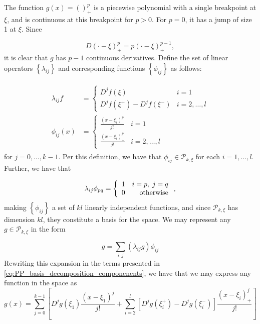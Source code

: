 \documentclass[12pt]{article}
\newcommand{\PP}{\mathcal{P}}
\theoremstyle{definition}
\begin{document}
The function $g\left(x\right) = \left(\right)_+^p$ is a piecewise polynomial with a single breakpoint at $\xi$, and is continuous at this breakpoint for $p>0$. For $p=0$, it has a jump of size 1 at $\xi$. Since

\[
D\left( \cdot - \xi\right)_+^p = p \left( \cdot - \xi\right)_+^{p-1},
\]
\noindent
it is clear that $g$ has $p-1$ continuous derivatives. Define the set of linear operators $\left\{ \lambda_{ij} \right\}$ and corresponding functions $\left\{ \phi_{ij} \right\}$ as follows:

\begin{align}
\begin{split}
\lambda_{ij}f  &= \left\{\begin{array}{lr}
	 D^{j}f\left(\xi \right) & i=1\\
	D^{j}f\left(\xi^+ \right) -  D^{j}f\left(\xi^-\right) & i=2,\dots,l
	\end{array} \right. \\
\phi_{ij}\left(x\right) &= \left\{\begin{array}{lr}
	\frac{\left(x-\xi_i \right)^p}{j!} & i=1\\
	\frac{\left(x-\xi_i \right)_+^p}{j!} & i=2,\dots,l
	\end{array} \right. 	
	\end{split} \label{eq:PP_basis_decomposition_componenents}
\end{align}
\noindent for $j=0,\dots,k-1$. Per this definition, we have that $\phi_{ij} \in \PP_{k,\xi}$ for each $i=1,\dots,l$. Further, we have that 

\begin{align*}
\lambda_{ij}\phi_{pq} = \left\{\begin{array}{lr}
	1  & i=p,\;j=q\\
	0 & \textup{otherwise}
	\end{array} \right. ,
\end{align*}
\noindent
making $\left\{ \phi_{ij} \right\}$ a set of $kl$ linearly independent functions, and since $\PP_{k,\xi}$ has dimension $kl$, they constitute a basis for the space. We may represent any $g \in \PP_{k,\xi}$ in the form

\begin{equation*}
g = \sum_{i,j} \left(\lambda_{ij}g\right)\phi_{ij}
\end{equation*}
\noindent
Rewriting this expansion in the terms presented in \ref{eq:PP_basis_decomposition_componenents}, we have that we may express any function in the space as
\begin{equation} \label{eq:tpf_basis_expansion}
g\left(x\right) = \sum_{j=0}^{k-1} \left[ D^j g\left(\xi_1\right)\frac{\left(x-\xi_1\right)^j}{j!} + \sum_{i=2}^l \left[ D^j g\left(\xi_i^+\right)-D^j g\left(\xi_i^-\right) \right]\frac{\left(x-\xi_i\right)_+^j}{j!} \right]
\end{equation}
\end{document}
